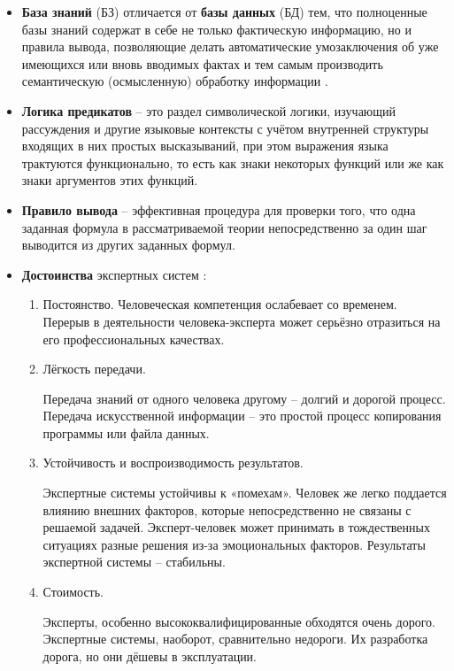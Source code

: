 \begin{itemize}
	\item \textbf{База знаний} (БЗ) отличается от \textbf{базы данных} (БД) тем, что полноценные базы знаний содержат в себе не только фактическую информацию, но и правила вывода, позволяющие делать автоматические умозаключения об уже имеющихся или вновь вводимых фактах и тем самым производить семантическую (осмысленную) обработку информации \cite{knowledge-base}.
	
	\item \textbf{Логика предикатов} -- это раздел символической логики, изучающий рассуждения и другие языковые контексты с учётом внутренней структуры входящих в них простых высказываний, при этом выражения языка трактуются функционально, то есть как знаки некоторых функций или же как знаки аргументов этих функций.
	
	\item \textbf{Правило вывода} -- эффективная процедура для проверки того, что одна заданная формула в рассматриваемой теории непосредственно за один шаг выводится из других заданных формул.
	
	\item \textbf{Достоинства} экспертных систем \cite{kb-pros}:
		\begin{enumerate}
			\item Постоянство. Человеческая компетенция ослабевает со временем. Перерыв в деятельности человека-эксперта может серьёзно отразиться на его профессиональных качествах.

			\item Лёгкость передачи.

			Передача знаний от одного человека другому – долгий и дорогой процесс. Передача искусственной информации – это простой процесс копирования программы или файла данных.

			\item Устойчивость и воспроизводимость результатов.

			Экспертные системы устойчивы к «помехам». Человек же легко поддается влиянию внешних факторов, которые непосредственно не связаны с решаемой задачей. Эксперт-человек может принимать в тождественных ситуациях разные решения из-за эмоциональных факторов. Результаты экспертной системы – стабильны.

			\item Стоимость.

			Эксперты, особенно высококвалифицированные обходятся очень дорого. Экспертные системы, наоборот, сравнительно недороги. Их разработка дорога, но они дёшевы в эксплуатации.
		\end{enumerate}
		

\end{itemize}
